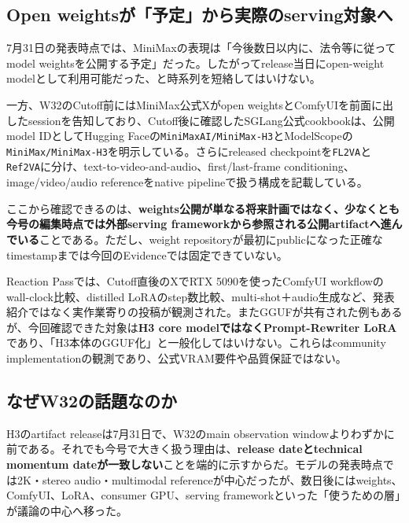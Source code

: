 \subsection*{Open weightsが「予定」から実際のserving対象へ}

7月31日の発表時点では、MiniMaxの表現は「今後数日以内に、法令等に従ってmodel weightsを公開する予定」だった\cite{minimax-h3-blog}。したがってrelease当日にopen-weight modelとして利用可能だった、と時系列を短絡してはいけない。

一方、W32のCutoff前にはMiniMax公式Xがopen weightsとComfyUIを前面に出したsessionを告知しており\cite{minimax-h3-x-openweights}、Cutoff後に確認したSGLang公式cookbookは、公開model IDとしてHugging Faceの\texttt{MiniMaxAI/MiniMax-H3}とModelScopeの\texttt{MiniMax/MiniMax-H3}を明示している。さらにreleased checkpointを\texttt{FL2VA}と\texttt{Ref2VA}に分け、text-to-video-and-audio、first/last-frame conditioning、image/video/audio referenceをnative pipelineで扱う構成を記載している\cite{sglang-h3-cookbook}。

ここから確認できるのは、\textbf{weights公開が単なる将来計画ではなく、少なくとも今号の編集時点では外部serving frameworkから参照される公開artifactへ進んでいる}ことである。ただし、weight repositoryが最初にpublicになった正確なtimestampまでは今回のEvidenceでは固定できていない。

\begin{communitynote}
Reaction Passでは、Cutoff直後のXでRTX 5090を使ったComfyUI workflowのwall-clock比較、distilled LoRAのstep数比較、multi-shot＋audio生成など、発表紹介ではなく実作業寄りの投稿が観測された\cite{h3-x-local-5090,h3-x-multishot-audio}。またGGUFが共有された例もあるが、今回確認できた対象は\textbf{H3 core modelではなくPrompt-Rewriter LoRA}であり、「H3本体のGGUF化」と一般化してはいけない\cite{h3-x-prompt-rewriter-gguf}。これらはcommunity implementationの観測であり、公式VRAM要件や品質保証ではない。
\end{communitynote}

\subsection*{なぜW32の話題なのか}

H3のartifact releaseは7月31日で、W32のmain observation windowよりわずかに前である。それでも今号で大きく扱う理由は、\textbf{release dateとtechnical momentum dateが一致しない}ことを端的に示すからだ。モデルの発表時点では2K・stereo audio・multimodal referenceが中心だったが、数日後にはweights、ComfyUI、LoRA、consumer GPU、serving frameworkといった「使うための層」が議論の中心へ移った\cite{minimax-h3-blog,minimax-h3-x-openweights,h3-x-local-5090}。

